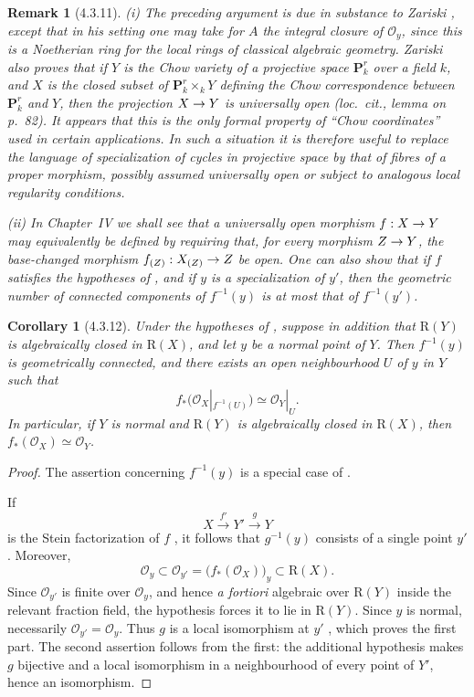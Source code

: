 \documentclass[oneside]{amsart}
\theoremstyle{ega-env-style}
\theoremstyle{ega-thm-env-style}
\newtheorem*{corollary}{Corollary}
\theoremstyle{ega-defn-env-style}
\newtheorem*{remark}{Remark}
\def\mathcal{\mathscr}
\def\sh{\mathcal}                   %
\renewcommand{\to}{\mathchoice{\longrightarrow}{\rightarrow}{\rightarrow}{\rightarrow}}
\newcommand{\oldpage}[2][]{{\marginnote{\normalfont{\textbf{#1}~|~#2}}}\ignorespaces}
\let\EGAOriginalLabel\label
\renewcommand{\label}[1]{\phantomsection\EGAOriginalLabel{#1}}
\begin{document}
\begin{remark}[4.3.11]
\label{III.4.3.11}
\emph{(i)}
The preceding argument is due in substance to Zariski
\cite{I-20}, except that in his setting one may take for $A$ the
integral closure of $\sh{O}_y$, since this is a Noetherian ring for
the local rings of classical algebraic geometry.  Zariski also
proves that if $Y$ is the Chow variety of a projective space
$\mathbf{P}_k^r$ over a field $k$, and $X$ is the closed subset of
$\mathbf{P}_k^r\times_kY$ defining the Chow correspondence between
$\mathbf{P}_k^r$ and $Y$, then the projection $X\to Y$ is
universally open (\emph{loc.\ cit.}, lemma on p.~82).
It appears that this is the only formal property of ``Chow
coordinates'' used in certain applications.  In such a situation it
is therefore useful to replace the language of specialization of
cycles in projective space by that of fibres of a proper morphism,
possibly assumed universally open or subject to analogous local
regularity conditions.

\emph{(ii)}
In Chapter~IV we shall see that a universally open morphism
$f:X\to Y$ may equivalently be defined by requiring that, for every
morphism $Z\to Y$, the base-changed morphism
$f_{(Z)}:X_{(Z)}\to Z$ be open.  One can also show that if $f$
satisfies the hypotheses of , and if $y$ is a
specialization of $y'$, then the geometric number of connected
components of $f^{-1}(y)$ is at most that of $f^{-1}(y')$.
\end{remark}

\begin{corollary}[4.3.12]
\label{III.4.3.12}
Under the hypotheses of , suppose in addition that
$\mathrm{R}(Y)$ is algebraically closed in $\mathrm{R}(X)$, and let $y$ be a
normal point of $Y$.  Then $f^{-1}(y)$ is geometrically connected,
and there exists an open neighbourhood $U$ of $y$ in $Y$ such that
\[
  f_*\bigl(\sh{O}_X|_{f^{-1}(U)}\bigr)
  \simeq
  \sh{O}_Y|_U.
\]
In particular, if $Y$ is normal and $\mathrm{R}(Y)$ is algebraically closed
in $\mathrm{R}(X)$, then $f_*(\sh{O}_X)\simeq\sh{O}_Y$.
\end{corollary}

\begin{proof}
The assertion concerning $f^{-1}(y)$ is a special case of
.

\oldpage[III]{135}

If
\[
  X\xrightarrow{f'}Y'\xrightarrow{g}Y
\]
is the Stein factorization of $f$ , it follows that
$g^{-1}(y)$ consists of a single point $y'$.  Moreover,
\[
  \sh{O}_y
  \subset
  \sh{O}_{y'}
  =
  \bigl(f_*(\sh{O}_X)\bigr)_y
  \subset
  \mathrm{R}(X).
\]
Since $\sh{O}_{y'}$ is finite over $\sh{O}_y$, and hence
\emph{a fortiori} algebraic over $\mathrm{R}(Y)$ inside the relevant
fraction field, the hypothesis forces it to lie in $\mathrm{R}(Y)$.  Since
$y$ is normal, necessarily $\sh{O}_{y'}=\sh{O}_y$.  Thus $g$ is a
local isomorphism at $y'$ , which proves the first
part.  The second assertion follows from the first: the additional
hypothesis makes $g$ bijective and a local isomorphism in a
neighbourhood of every point of $Y'$, hence an isomorphism.
\end{proof}
\end{document}
